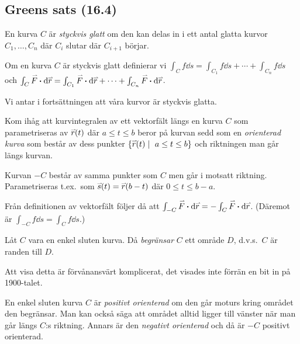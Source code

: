 \documentclass[a4paper]{article}
\begin{document}
\subsection{Greens sats (16.4)}
\begin{defn}
    En kurva \(
        C
    \) är \emph{styckvis glatt} om den kan delas in i ett antal glatta kurvor \(
        C_1, \dots, C_n
    \) där \(
        C_i 
    \) slutar där \(
        C_{i+1}
    \) börjar. 
\end{defn}

\begin{defn}
    Om en kurva \(
        C
    \) är styckvis glatt definierar vi \(
        \int_C f \dd s = \int_{C_1} f \dd s + \cdots + \int_{C_n} f \dd s
    \) och \(
        \int_C \accentset{\rightharpoonup}{F} \boldsymbol{\cdot} \dd \accentset{\rightharpoonup}{r} = \int_{C_1} \accentset{\rightharpoonup}{F} \boldsymbol{\cdot} \dd \accentset{\rightharpoonup}{r} + \cdots + \int_{C_n} \accentset{\rightharpoonup}{F} \boldsymbol{\cdot} \dd \accentset{\rightharpoonup}{r} 
    \).
\end{defn}

Vi antar i fortsättningen att våra kurvor är styckvis glatta. 

Kom ihåg att kurvintegralen av ett vektorfält längs en kurva \(
    C
\) som parametriseras av \(
    \accentset{\rightharpoonup}{r}(t)
\) där \(
    a \leq t \leq b
\) beror på kurvan sedd som en \emph{orienterad kurva} som består av dess punkter 
\(
    \{ \ver(t) \; | \; a \leq t \leq b \}
\) och riktningen man går längs kurvan. 
\begin{defn}
    Kurvan \(
        -C
    \) består av samma punkter som \(
        C
    \) men går i motsatt riktning. Parametriseras t.ex.\ som \(
        \accentset{\rightharpoonup}{s}(t) = \accentset{\rightharpoonup}{r}(b-t) 
    \) där \(
        0 \leq t \leq b-a
    \).
\end{defn}

Från definitionen av vektorfält följer då att \(
    \int_{-C} \accentset{\rightharpoonup}{F} \boldsymbol{\cdot} \dd \accentset{\rightharpoonup}{r} = - \int_C \accentset{\rightharpoonup}{F} \boldsymbol{\cdot} \dd \accentset{\rightharpoonup}{r}
\). (Däremot är \(
    \int_{-C} f \dd s = \int_C f \dd s
\).)

\begin{defn}
    Låt \(
        C
    \) vara en enkel sluten kurva. Då \emph{begränsar} \(
        C
    \) ett område \(
        D
    \), d.v.s.\ \(
        C
    \) är randen till \(
        D
    \).

    Att visa detta är förvånansvärt komplicerat, det visades inte förrän en bit in
    på 1900-talet.
\end{defn}

\begin{defn}
    En enkel sluten kurva \(
        C
    \) är \emph{positivt orienterad} om den går moturs kring området den begränsar.
    Man kan också säga att området alltid ligger till vänster när man går längs
    \(
        C
    \):s riktning. Annars är den \emph{negativt orienterad} och då är \(
        -C
    \) positivt orienterad.
\end{defn}
\end{document}
